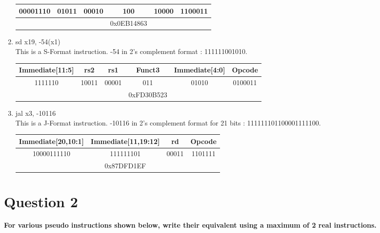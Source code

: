 \begin{enumerate}
\begin{tabular}{|c|c|c|c|c|c|}
            \hline
            00001110 & 01011 & 00010 & 100 & 10000 & 1100011\\
            \hline
            &&&0x0EB14863&& \\
            \hline
        \end{tabular}
    \item sd x19, -54(x1)
        \\
        This is a S-Format instruction. -54 in 2's complement format : 111111001010. 
        \begin{tabular}{|c|c|c|c|c|c|}
            \hline
            Immediate[11:5] & rs2 & rs1 & Funct3 & Immediate[4:0] & Opcode \\
            \hline
            1111110 & 10011 & 00001 & 011 & 01010 & 0100011\\
            \hline
            &&&0xFD30B523&& \\
            \hline
        \end{tabular}
    \item jal x3, -10116
        \\
        This is a J-Format instruction. -10116 in 2's complement format for 21 bits : 111111101100001111100. \\
        \begin{tabular}{|c|c|c|c|}
            \hline
            Immediate[20,10:1] & Immediate[11,19:12] & rd & Opcode \\
            \hline
            10000111110 & 111111101 & 00011 & 1101111\\
            \hline
            &0x87DFD1EF&& \\
            \hline
        \end{tabular}
\end{enumerate}

\section{Question 2}
\textbf{For various pseudo instructions shown below, write their equivalent using a maximum of 2 real instructions.}

